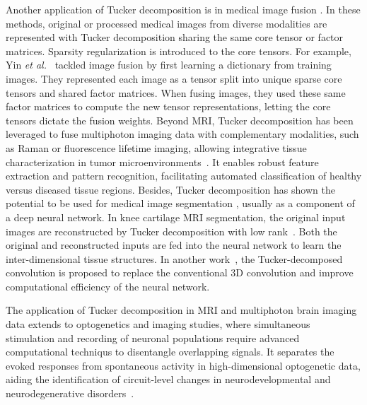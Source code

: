 Another application of Tucker decomposition is in medical image fusion \cite{yin2018tensor, zhang2023tdfusion, chen2024multi}. In these methods, original or processed medical images from diverse modalities are represented with Tucker decomposition sharing the same core tensor or factor matrices. Sparsity regularization is introduced to the core tensors. For example, Yin \textit{et al.}~\cite{yin2018tensor} tackled image fusion by first learning a dictionary from training images. They represented each image as a tensor split into unique sparse core tensors and shared factor matrices. When fusing images, they used these same factor matrices to compute the new tensor representations, letting the core tensors dictate the fusion weights. Beyond MRI, Tucker decomposition has been leveraged to fuse multiphoton imaging data with complementary modalities, such as Raman or fluorescence lifetime imaging, allowing integrative tissue characterization in tumor microenvironments~\cite{karahan2015tensor}. It enables robust feature extraction and pattern recognition, facilitating automated classification of healthy versus diseased tissue regions. 
Besides, Tucker decomposition has shown the potential to be used for medical image segmentation \cite{khan2022deep, weber2025posttraining}, usually as a component of a deep neural network. In knee cartilage MRI segmentation, the original input images are reconstructed by Tucker decomposition with low rank~\cite{khan2022deep}. 
Both the original and reconstructed inputs are fed into the neural network to learn the inter-dimensional tissue structures. In another work~\cite{weber2025posttraining}, the Tucker-decomposed convolution is proposed to replace the conventional 3D convolution and improve computational efficiency of the neural network. 

The application of Tucker decomposition in MRI and multiphoton brain imaging data extends to optogenetics and imaging studies, where simultaneous stimulation and recording of neuronal populations require advanced computational techniqus to disentangle overlapping signals. It separates the evoked responses from spontaneous activity in high-dimensional optogenetic data, aiding the identification of circuit-level changes in neurodevelopmental and neurodegenerative disorders~\cite{erol2022tensors}. 


